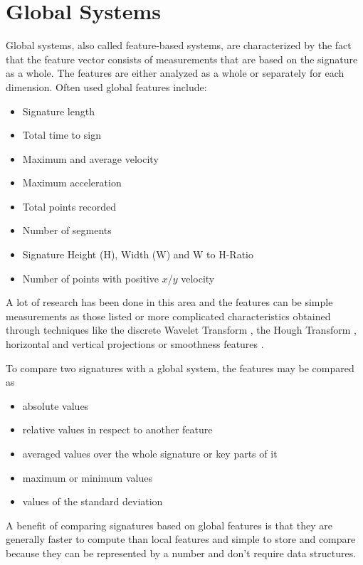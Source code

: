 \documentclass[a4paper, oneside]{csthesis}
\begin{document}
\section{Global Systems}
\label{sec:features}

Global systems, also called feature-based systems, are characterized by the fact that the feature vector consists of measurements that are based on the signature as a whole. The features are either analyzed as a whole or separately for each dimension. Often used global features include:

\begin{itemize}
\item Signature length
\item Total time to sign
\item Maximum and average velocity
\item Maximum acceleration
\item Total points recorded
\item Number of segments
\item Signature Height (H), Width (W) and W to H-Ratio
\item Number of points with positive $x$/$y$ velocity
\end{itemize}


A lot of research has been done in this area and the features can be simple measurements as those listed or more complicated characteristics obtained through techniques like the discrete Wavelet Transform \cite{ji2005signature}, the Hough Transform \cite{kaewkongka1999off}, horizontal and vertical projections \cite{fang2003off} or smoothness features \cite{fang2001offline}.

To compare two signatures with a global system, the features may be compared as
\begin{itemize}
\item absolute values
\item relative values in respect to another feature
\item averaged values over the whole signature or key parts of it
\item maximum or minimum values
\item values of the standard deviation
\end{itemize}

A benefit of comparing signatures based on global features is that they are generally faster to compute than local features and simple to store and compare because they can be represented by a number and don't require data structures.
\end{document}
